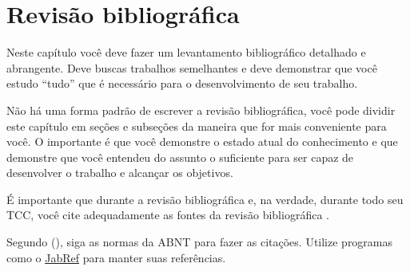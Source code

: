 %
%
%


\chapter{Revisão bibliográfica}
\label{sec:revbib}

Neste capítulo você deve fazer um levantamento bibliográfico detalhado e
abrangente. Deve buscas trabalhos semelhantes e deve demonstrar que você estudo
``tudo'' que é necessário para o desenvolvimento de seu trabalho.

Não há uma forma padrão de escrever a revisão bibliográfica, você pode dividir
este capítulo em seções e subseções da maneira que for mais conveniente para
você. O importante é que você demonstre o estado atual do conhecimento e que
demonstre que você entendeu do assunto o suficiente para ser capaz de
desenvolver o trabalho e alcançar os objetivos.

É importante que durante a revisão bibliográfica e, na verdade, durante todo seu
TCC, você cite adequadamente as fontes da revisão bibliográfica
\cite{Thompson1998}.

Segundo  (\citeyear{Graham1994}), siga as normas da
ABNT para fazer as citações. Utilize programas como o
\href{https://www.jabref.org/}{JabRef} para manter suas referências.

